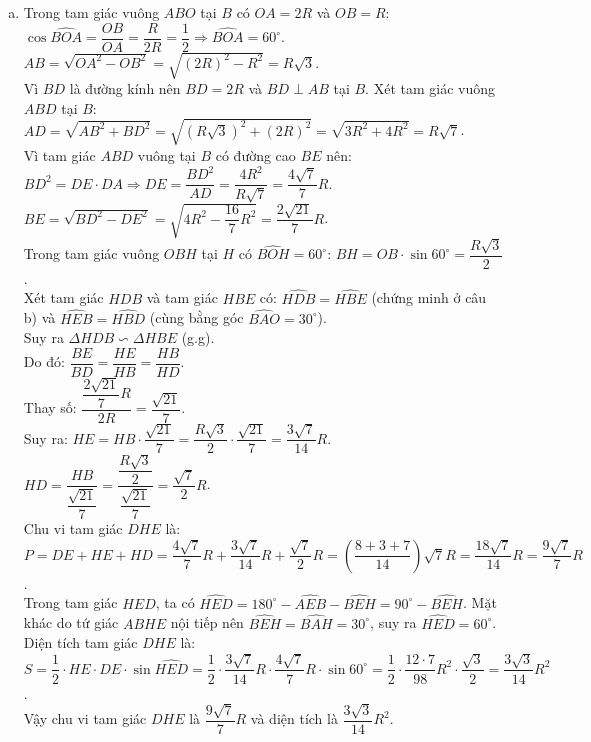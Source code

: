 \begin{bt}
{\begin{enumerate}[a)]
	Mà $E, A, D$ thẳng hàng nên $\widehat{EAH} = \widehat{EAB}$.\\
	Từ đó suy ra $\widehat{HDO} = \widehat{HBE}$.
	\item Trong tam giác vuông $ABO$ tại $B$ có $OA = 2R$ và $OB = R$:\\
	$\cos\widehat{BOA} = \dfrac{OB}{OA} = \dfrac{R}{2R} = \dfrac{1}{2} \Rightarrow \widehat{BOA} = 60^\circ$.\\
	$AB = \sqrt{OA^2 - OB^2} = \sqrt{(2R)^2 - R^2} = R\sqrt{3}$.\\
	Vì $BD$ là đường kính nên $BD = 2R$ và $BD \perp AB$ tại $B$. Xét tam giác vuông $ABD$ tại $B$:
	$AD = \sqrt{AB^2 + BD^2} = \sqrt{(R\sqrt{3})^2 + (2R)^2} = \sqrt{3R^2 + 4R^2} = R\sqrt{7}$.\\
	Vì tam giác $ABD$ vuông tại $B$ có đường cao $BE$ nên:
	$BD^2 = DE \cdot DA \Rightarrow DE = \dfrac{BD^2}{AD} = \dfrac{4R^2}{R\sqrt{7}} = \dfrac{4\sqrt{7}}{7}R$.\\
	$BE = \sqrt{BD^2 - DE^2} = \sqrt{4R^2 - \dfrac{16}{7}R^2} = \dfrac{2\sqrt{21}}{7}R$.\\
	Trong tam giác vuông $OBH$ tại $H$ có $\widehat{BOH} = 60^\circ$:
	$BH = OB \cdot \sin 60^\circ = \dfrac{R\sqrt{3}}{2}$.\\
	Xét tam giác $HDB$ và tam giác $HBE$ có:
	$\widehat{HDB} = \widehat{HBE}$ (chứng minh ở câu b) và $\widehat{HEB} = \widehat{HBD}$ (cùng bằng góc $\widehat{BAO} = 30^\circ$).\\
	Suy ra $\Delta HDB \backsim \Delta HBE$ (g.g).\\
	Do đó: $\dfrac{BE}{BD} = \dfrac{HE}{HB} = \dfrac{HB}{HD}$.\\
	Thay số: $\dfrac{\dfrac{2\sqrt{21}}{7}R}{2R} = \dfrac{\sqrt{21}}{7}$.\\
	Suy ra:
	$HE = HB \cdot \dfrac{\sqrt{21}}{7} = \dfrac{R\sqrt{3}}{2} \cdot \dfrac{\sqrt{21}}{7} = \dfrac{3\sqrt{7}}{14}R$.\\
	$HD = \dfrac{HB}{\dfrac{\sqrt{21}}{7}} = \dfrac{\dfrac{R\sqrt{3}}{2}}{\dfrac{\sqrt{21}}{7}} = \dfrac{\sqrt{7}}{2}R$.\\
	Chu vi tam giác $DHE$ là:
	$P = DE + HE + HD = \dfrac{4\sqrt{7}}{7}R + \dfrac{3\sqrt{7}}{14}R + \dfrac{\sqrt{7}}{2}R = \left(\dfrac{8 + 3 + 7}{14}\right)\sqrt{7}R = \dfrac{18\sqrt{7}}{14}R = \dfrac{9\sqrt{7}}{7}R$.\\
	Trong tam giác $HED$, ta có $\widehat{HED} = 180^\circ - \widehat{AEB} - \widehat{BEH} = 90^\circ - \widehat{BEH}$. Mặt khác do tứ giác $ABHE$ nội tiếp nên $\widehat{BEH} = \widehat{BAH} = 30^\circ$, suy ra $\widehat{HED} = 60^\circ$.\\
	Diện tích tam giác $DHE$ là:
	$S = \dfrac{1}{2} \cdot HE \cdot DE \cdot \sin\widehat{HED} = \dfrac{1}{2} \cdot \dfrac{3\sqrt{7}}{14}R \cdot \dfrac{4\sqrt{7}}{7}R \cdot \sin 60^\circ = \dfrac{1}{2} \cdot \dfrac{12\cdot 7}{98}R^2 \cdot \dfrac{\sqrt{3}}{2} = \dfrac{3\sqrt{3}}{14}R^2$.\\
	Vậy chu vi tam giác $DHE$ là $\dfrac{9\sqrt{7}}{7}R$ và diện tích là $\dfrac{3\sqrt{3}}{14}R^2$.
\end{enumerate}
}
\end{bt}
